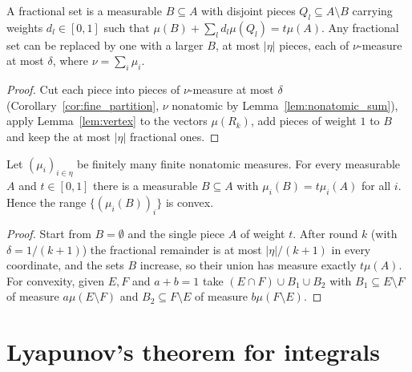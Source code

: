\begin{lemma}
\label{lem:lyapunov_round}
\leanok
{}
A fractional set is a measurable $B \subseteq A$ with disjoint pieces $Q_l \subseteq A \setminus B$ carrying weights
$d_l \in [0,1]$ such that $\mu(B) + \sum_l d_l \mu(Q_l) = t\mu(A)$. Any fractional set can be replaced by one with a larger
$B$, at most $|\eta|$ pieces, each of $\nu$-measure at most $\delta$, where $\nu = \sum_i \mu_i$.
\end{lemma}
\begin{proof}
\leanok
Cut each piece into pieces of $\nu$-measure at most $\delta$ (Corollary~\ref{cor:fine_partition}, $\nu$ nonatomic by
Lemma~\ref{lem:nonatomic_sum}), apply Lemma~\ref{lem:vertex} to the vectors $\mu(R_k)$, add pieces of weight $1$ to $B$ and
keep the at most $|\eta|$ fractional ones.
\end{proof}

\begin{theorem}[Lyapunov 1940]
\label{thm:lyapunov}
\leanok
{}
Let $(\mu_i)_{i \in \eta}$ be finitely many finite nonatomic measures. For every measurable $A$ and $t \in [0,1]$ there is a
measurable $B \subseteq A$ with $\mu_i(B) = t\mu_i(A)$ for all $i$. Hence the range $\{(\mu_i(B))_i\}$ is convex.
\end{theorem}
\begin{proof}
\leanok
Start from $B = \emptyset$ and the single piece $A$ of weight $t$. After round $k$ (with $\delta = 1/(k+1)$) the fractional
remainder is at most $|\eta|/(k+1)$ in every coordinate, and the sets $B$ increase, so their union has measure exactly
$t\mu(A)$. For convexity, given $E, F$ and $a + b = 1$ take $(E \cap F) \cup B_1 \cup B_2$ with $B_1 \subseteq E \setminus F$
of measure $a\mu(E \setminus F)$ and $B_2 \subseteq F \setminus E$ of measure $b\mu(F \setminus E)$.
\end{proof}

\section{Lyapunov's theorem for integrals}
\label{sec:lyapunov_integral}

